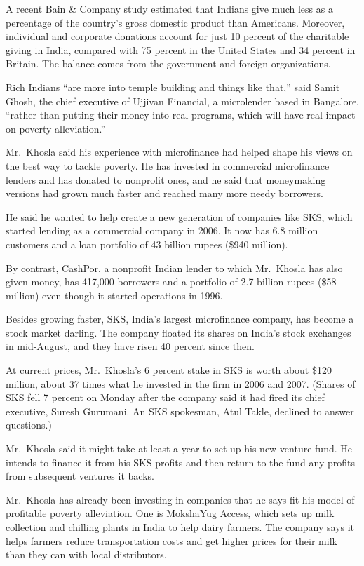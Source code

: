 ﻿\documentclass[12pt]{article}
\begin{document}
A recent Bain \& Company study estimated that Indians give much less as a percentage of the
country's gross domestic product than Americans. Moreover, individual and corporate donations
account for just 10 percent of the charitable giving in India, compared with 75 percent in the
United States and 34 percent in Britain. The balance comes from the government and foreign
organizations.

Rich Indians ``are more into temple building and things like that,'' said Samit Ghosh, the chief
executive of Ujjivan Financial, a microlender based in Bangalore, ``rather than putting their money
into real programs, which will have real impact on poverty alleviation.''

Mr.~Khosla said his experience with microfinance had helped shape his views on the best way to
tackle poverty. He has invested in commercial microfinance lenders and has donated to nonprofit
ones, and he said that moneymaking versions had grown much faster and reached many more needy
borrowers.

He said he wanted to help create a new generation of companies like SKS, which started lending as a
commercial company in 2006. It now has 6.8 million customers and a loan portfolio of 43 billion
rupees (\$940 million).

By contrast, CashPor, a nonprofit Indian lender to which Mr.~Khosla has also given money, has
417,000 borrowers and a portfolio of 2.7 billion rupees (\$58 million) even though it started
operations in 1996.

Besides growing faster, SKS, India's largest microfinance company, has become a stock market
darling. The company floated its shares on India's stock exchanges in mid-August, and they have
risen 40 percent since then.

At current prices, Mr.~Khosla's 6 percent stake in SKS is worth about \$120 million, about 37 times
what he invested in the firm in 2006 and 2007. (Shares of SKS fell 7 percent on Monday after the
company said it had fired its chief executive, Suresh Gurumani. An SKS spokesman, Atul Takle,
declined to answer questions.)

Mr.~Khosla said it might take at least a year to set up his new venture fund. He intends to finance
it from his SKS profits and then return to the fund any profits from subsequent ventures it backs.

Mr.~Khosla has already been investing in companies that he says fit his model of profitable poverty
alleviation. One is MokshaYug Access, which sets up milk collection and chilling plants in India to
help dairy farmers. The company says it helps farmers reduce transportation costs and get higher
prices for their milk than they can with local distributors.
\end{document}
